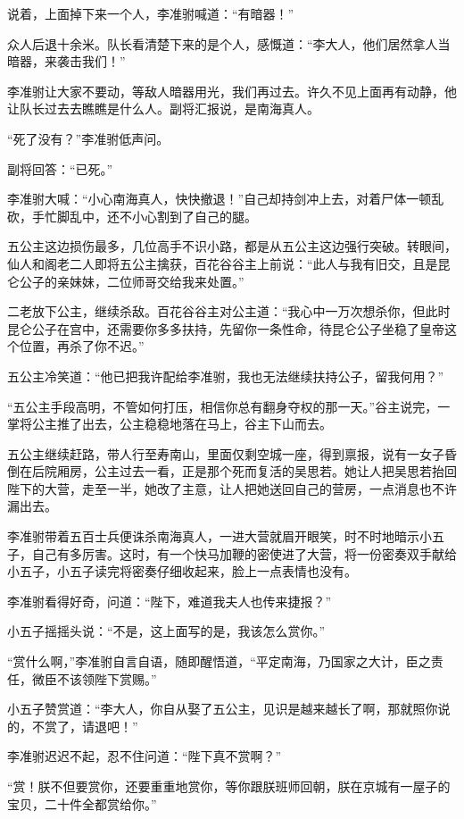 说着，上面掉下来一个人，李准驸喊道：“有暗器！”

众人后退十余米。队长看清楚下来的是个人，感慨道：“李大人，他们居然拿人当暗器，来袭击我们！”

李准驸让大家不要动，等敌人暗器用光，我们再过去。许久不见上面再有动静，他让队长过去去瞧瞧是什么人。副将汇报说，是南海真人。

“死了没有？”李准驸低声问。

副将回答：“已死。”

李准驸大喊：“小心南海真人，快快撤退！”自己却持剑冲上去，对着尸体一顿乱砍，手忙脚乱中，还不小心割到了自己的腿。
\newline

五公主这边损伤最多，几位高手不识小路，都是从五公主这边强行突破。转眼间，仙人和阁老二人即将五公主擒获，百花谷谷主上前说：“此人与我有旧交，且是昆仑公子的亲妹妹，二位师哥交给我来处置。”

二老放下公主，继续杀敌。百花谷谷主对公主道：“我心中一万次想杀你，但此时昆仑公子在宫中，还需要你多多扶持，先留你一条性命，待昆仑公子坐稳了皇帝这个位置，再杀了你不迟。”

五公主冷笑道：“他已把我许配给李准驸，我也无法继续扶持公子，留我何用？”

“五公主手段高明，不管如何打压，相信你总有翻身夺权的那一天。”谷主说完，一掌将公主推了出去，公主稳稳地落在马上，谷主下山而去。

五公主继续赶路，带人行至寿南山，里面仅剩空城一座，得到禀报，说有一女子昏倒在后院厢房，公主过去一看，正是那个死而复活的吴思若。她让人把吴思若抬回陛下的大营，走至一半，她改了主意，让人把她送回自己的营房，一点消息也不许漏出去。
\newline

李准驸带着五百士兵便诛杀南海真人，一进大营就眉开眼笑，时不时地暗示小五子，自己有多厉害。这时，有一个快马加鞭的密使进了大营，将一份密奏双手献给小五子，小五子读完将密奏仔细收起来，脸上一点表情也没有。

李准驸看得好奇，问道：“陛下，难道我夫人也传来捷报？”

小五子摇摇头说：“不是，这上面写的是，我该怎么赏你。”

“赏什么啊，”李准驸自言自语，随即醒悟道，“平定南海，乃国家之大计，臣之责任，微臣不该领陛下赏赐。”

小五子赞赏道：“李大人，你自从娶了五公主，见识是越来越长了啊，那就照你说的，不赏了，请退吧！”

李准驸迟迟不起，忍不住问道：“陛下真不赏啊？”

“赏！朕不但要赏你，还要重重地赏你，等你跟朕班师回朝，朕在京城有一屋子的宝贝，二十件全都赏给你。”


